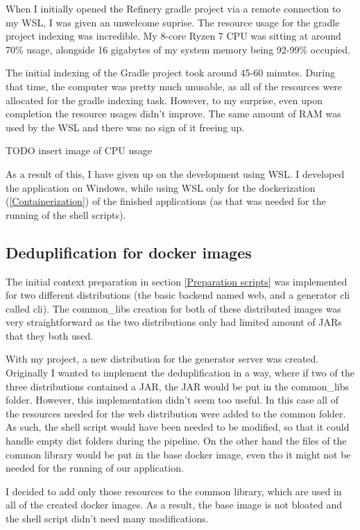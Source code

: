 		When I initially opened the Refinery gradle project via a remote connection to my WSL, I was given an unwelcome suprise. The resource usage 
		for the gradle project indexing was incredible. My 8-core Ryzen 7 CPU was sitting at around 70\%  usage, alongside 
		16 gigabytes of my system memory being 92-99\% occupied. 
		
		The initial indexing of the Gradle project took around 45-60 minutes. During that time, the computer was pretty much unusable, as all of the resources
		were allocated for the gradle indexing task. However, to my surprise, even upon completion the resource usages didn't improve. The same amount of RAM
		was used by the WSL and there was no sign of it freeing up. 

		TODO insert image of CPU usage

		As a result of this, I have given up on the development using WSL. I developed the application on Windows, while using WSL only for the
		dockerization (\ref{Containerization}) of the finished applications (as that was needed for the running of the shell scripts).

	\subsection{Deduplification for docker images}
		The initial context preparation in section \ref{Preparation scripts} was implemented for two different distributions (the basic backend 
		named web, and a generator cli called cli). The common\_libs creation for both of these distributed images was very straightforward
		as the two distributions only had limited amount of JARs that they both used.

		With my project, a new distribution for the generator server was created. Originally I wanted to implement the deduplification in a way,
		where if two of the three distributions contained a JAR, the JAR would be put in the common\_libs folder.
		However, this implementation didn't seem too useful. In this case all of the resources needed for the web distribution were added to the common folder.
		As such, the shell script would have been needed to be modified, so that it could handle empty dist folders during the pipeline. On the other hand
		the files of the common library would be put in the base docker image, even tho it might not be needed for the running of our application.

		I decided to add only those resources to the common library, which are used in all of the created docker images. 
		As a result, the base image is not bloated and the shell script didn't need many modifications.

